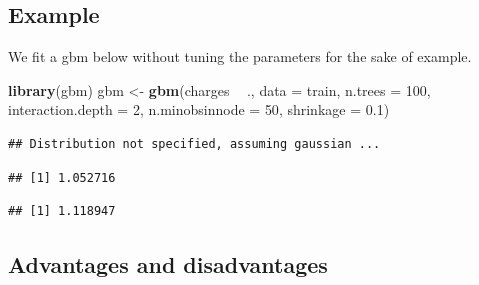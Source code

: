 \documentclass[
  openany]{book}
\newenvironment{Shaded}{\begin{snugshade}}{\end{snugshade}}
\newcommand{\DataTypeTok}[1]{\textcolor[rgb]{0.13,0.29,0.53}{#1}}
\newcommand{\DecValTok}[1]{\textcolor[rgb]{0.00,0.00,0.81}{#1}}
\newcommand{\FloatTok}[1]{\textcolor[rgb]{0.00,0.00,0.81}{#1}}
\newcommand{\KeywordTok}[1]{\textcolor[rgb]{0.13,0.29,0.53}{\textbf{#1}}}
\newcommand{\NormalTok}[1]{#1}
\newcommand{\OperatorTok}[1]{\textcolor[rgb]{0.81,0.36,0.00}{\textbf{#1}}}
\newcommand{\StringTok}[1]{\textcolor[rgb]{0.31,0.60,0.02}{#1}}
\begin{document}
\hypertarget{example-4}{%
\subsection{Example}\label{example-4}}

We fit a gbm below without tuning the parameters for the sake of example.

\begin{Shaded}
\begin{Highlighting}[]
\KeywordTok{library}\NormalTok{(gbm)}
\NormalTok{gbm <-}\StringTok{ }\KeywordTok{gbm}\NormalTok{(charges }\OperatorTok{~}\StringTok{ }\NormalTok{., }\DataTypeTok{data =}\NormalTok{ train,}
           \DataTypeTok{n.trees =} \DecValTok{100}\NormalTok{,}
           \DataTypeTok{interaction.depth =} \DecValTok{2}\NormalTok{,}
           \DataTypeTok{n.minobsinnode =} \DecValTok{50}\NormalTok{,}
           \DataTypeTok{shrinkage =} \FloatTok{0.1}\NormalTok{)}
\end{Highlighting}
\end{Shaded}

\begin{verbatim}
## Distribution not specified, assuming gaussian ...
\end{verbatim}

\begin{Shaded}
\end{Shaded}

\begin{verbatim}
## [1] 1.052716
\end{verbatim}

\begin{Shaded}
\end{Shaded}

\begin{verbatim}
## [1] 1.118947
\end{verbatim}

\hypertarget{advantages-and-disadvantages-4}{%
\subsection{Advantages and disadvantages}\label{advantages-and-disadvantages-4}}
\end{document}
